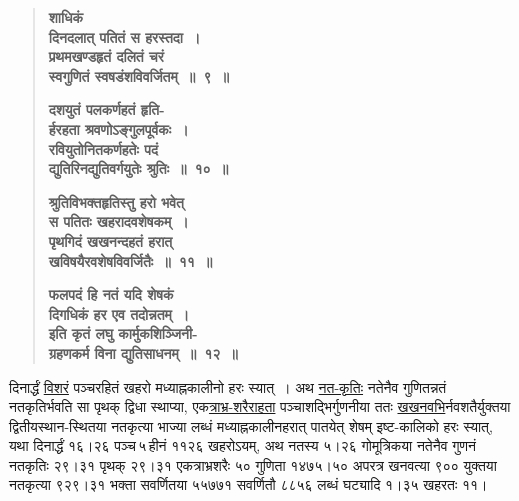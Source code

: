 \documentclass[11pt, openany]{book}
\begin{document}
 \label{3.9}
\begin{quote}
{\large \textbf{{\color{purple}शाधिकं \\
दिनदलात् पतितं स हरस्तदा~। \\
प्रथमखण्डहृतं दलितं चरं \\
स्वगुणितं स्वषडंशविवर्जितम्~॥~९~॥}}
\vspace{1mm}

 \label{3.10}
\textbf{{\color{purple}दशयुतं पलकर्णहतं हृति-\\
र्हरहता श्रवणोऽङ्गुलपूर्वकः~। \\
रवियुतोनितकर्णहतेः पदं \\
द्युतिरिनद्युतिवर्गयुतेः श्रुतिः~॥~१०~॥}}
\vspace{1mm}

 \label{3.11}
\textbf{{\color{purple}श्रुतिविभक्तहृतिस्तु हरो भवेत् \\
स पतितः खहरादवशेषकम्~। \\
पृथगिदं खखनन्दहतं हरात् \\
खविषयैरवशेषविवर्जितैः~॥~११~॥}}
\vspace{1mm}

 \label{3.12}
\textbf{{\color{purple}फलपदं हि नतं यदि शेषकं \\
दिगधिकं हर एव तदोन्नतम्~। \\
इति कृतं लघु कार्मुकशिञ्जिनी-\\
ग्रहणकर्म विना द्युतिसाधनम्~॥~१२~॥}}}
\end{quote}

दिनार्द्धं \hyperref[3.8]{विशरं} पञ्चरहितं खहरो मध्याह्नकालीनो हरः स्यात्~। अथ \hyperref[3.8]{नत-कृतिः} नतेनैव गुणितन्नतं नतकृतिर्भवति सा पृथक् द्विधा स्थाप्या, एक\hyperref[3.8]{त्राभ्र-शरैराहता} पञ्चाशद्भिर्गुणनीया ततः \hyperref[3.8]{खखनवभि}र्नवशतैर्युक्तया द्वितीयस्थान-स्थितया \;नतकृत्या \;भाज्या \;लब्धं \;मध्याह्नकालीनहरात् \;पातयेत् \;शेषम् \;इष्ट-कालिको हरः स्यात्, यथा दिनार्द्धं १६।२६ पञ्च\textendash \,५\textendash \,हीनं ११२६ खहरोऽयम्, अथ नतस्य ५।२६ गोमूत्रिकया नतेनैव गुणनं नतकृतिः २९।३१ पृथक् २९।३१ एकत्राभ्रशरैः ५० गुणिता १४७५।५० अपरत्र खनवत्या ९०० युक्तया नतकृत्या ९२९।३१ भक्ता सवर्णितया ५५७७१ सवर्णितौ ८८५६ लब्धं घट्यादि १।३५ खहरतः ११।

\newpage
\end{document}
